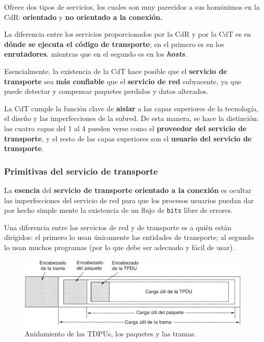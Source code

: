 \documentclass[10pt,a4paper]{article}
\begin{document}
Ofrece dos tipos de servicios, los cuales son muy parecidos a sus homónimos en la CdR:
\textbf{orientado} y \textbf{no orientado a la conexión.} 

La diferencia entre los servicios proporcionados por la CdR y por la CdT es en \textbf{dónde se ejecuta el código de transporte}; en el primero es en los \textbf{enrutadores}, mientras que en el segundo es en los \textit{\textbf{hosts}}.

Esencialmente, la existencia de la CdT hace posible que el \textbf{servicio de transporte} sea \textbf{más confiable} que el \textbf{servicio de red} subyacente, ya que puede detectar y compensar paquetes perdidos y datos alterados. 

La CdT cumple la función clave de \textbf{aislar} a las capas superiores de la tecnología, el diseño y las imperfecciones de la subred. De esta manera, se hace la distinción: las cuatro capas del 1 al 4 pueden verse como el \textbf{proveedor del servicio de transporte}, y el resto de las capas superiores son el \textbf{usuario del servicio de transporte}.

\subsubsection{Primitivas del servicio de transporte}

La \textbf{esencia} del \textbf{servicio de transporte orientado a la conexión} es ocultar las imperfecciones del servicio de red para que los procesos usuarios puedan dar por hecho simple mente la existencia de un flujo de \texttt{bits} libre de errores.

Una diferencia entre los servicios de red y de transporte es a quién están dirigidos: el primero lo usan únicamente las entidades de transporte; al segundo lo usan muchos programas (por lo que debe ser adecuado y fácil de usar).

\begin{figure}[ht!]
  \caption{Anidamiento de las TDPUs, los paquetes y las tramas.}
  \label{fig:anidamiento}
  \centerline{\includegraphics[width=0.95\textwidth-\fboxrule-\fboxrule]{imgs/anidamiento.png}}
\end{figure}
\end{document}
